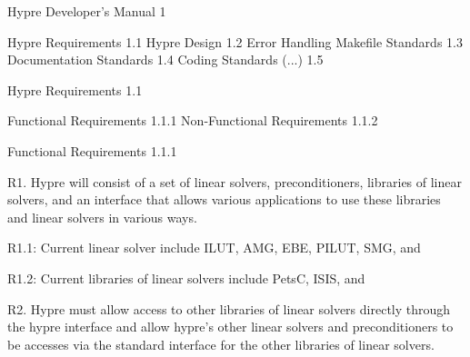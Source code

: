 \documentclass{article}
\begin{document}
\begin{cxxentry}
{}
        {Hypre Developer's Manual}
        {}
        {}
        {1}
\begin{cxxdoc}

\end{cxxdoc}
\begin{cxxnames}
\cxxitem{}
        {Hypre Requirements}
        {}
        {}
        {1.1}
\cxxitem{}
        {Hypre Design}
        {}
        {}
        {1.2}
\cxxitem{}
        {Error Handling}
        {}
        {}
        {}
\label{cxx.1.6}
\cxxitem{}
        {Makefile Standards}
        {}
        {}
        {1.3}
\cxxitem{}
        {Documentation Standards}
        {}
        {}
        {1.4}
\cxxitem{}
        {Coding Standards}
        {(...)}
        {}
        {1.5}
\end{cxxnames}
\begin{cxxentry}
{}
        {Hypre Requirements}
        {}
        {}
        {1.1}
\begin{cxxnames}
\cxxitem{}
        {Functional Requirements}
        {}
        {}
        {1.1.1}
\cxxitem{}
        {Non-Functional Requirements}
        {}
        {}
        {1.1.2}
\end{cxxnames}
\begin{cxxentry}
{}
        {Functional Requirements}
        {}
        {}
        {1.1.1}
\begin{cxxdoc}

R1.	Hypre will consist of a set of linear solvers, preconditioners,
libraries of linear solvers, and an interface that allows various 
applications to use these libraries and linear solvers in various ways.

R1.1: Current linear solver include ILUT, AMG, EBE, PILUT, SMG, and


R1.2: Current libraries of linear solvers include PetsC, ISIS, and



R2.	Hypre must allow access to other libraries of linear solvers
directly through the hypre interface and allow hypre's other linear
solvers and preconditioners to be accesses via the standard interface 
for the other libraries of linear solvers.



\end{cxxdoc}
\end{cxxentry}
\end{cxxentry}
\end{cxxentry}
\end{document}

